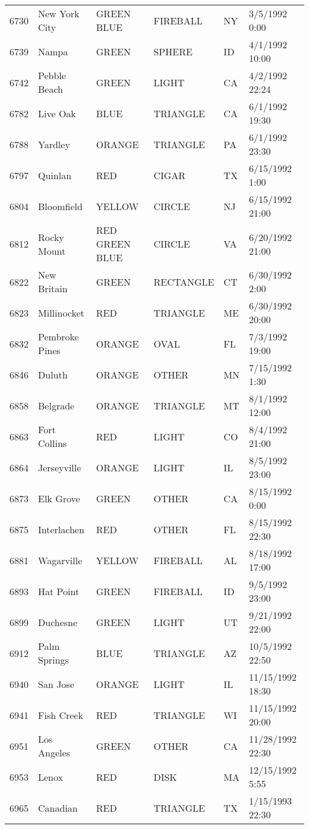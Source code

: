 \begin{tabular}{llllll}
6730 & New York City & GREEN BLUE & FIREBALL & NY & 3/5/1992 0:00 \\
6739 & Nampa & GREEN & SPHERE & ID & 4/1/1992 10:00 \\
6742 & Pebble Beach & GREEN & LIGHT & CA & 4/2/1992 22:24 \\
6782 & Live Oak & BLUE & TRIANGLE & CA & 6/1/1992 19:30 \\
6788 & Yardley & ORANGE & TRIANGLE & PA & 6/1/1992 23:30 \\
6797 & Quinlan & RED & CIGAR & TX & 6/15/1992 1:00 \\
6804 & Bloomfield & YELLOW & CIRCLE & NJ & 6/15/1992 21:00 \\
6812 & Rocky Mount & RED GREEN BLUE & CIRCLE & VA & 6/20/1992 21:00 \\
6822 & New Britain & GREEN & RECTANGLE & CT & 6/30/1992 2:00 \\
6823 & Millinocket & RED & TRIANGLE & ME & 6/30/1992 20:00 \\
6832 & Pembroke Pines & ORANGE & OVAL & FL & 7/3/1992 19:00 \\
6846 & Duluth & ORANGE & OTHER & MN & 7/15/1992 1:30 \\
6858 & Belgrade & ORANGE & TRIANGLE & MT & 8/1/1992 12:00 \\
6863 & Fort Collins & RED & LIGHT & CO & 8/4/1992 21:00 \\
6864 & Jerseyville & ORANGE & LIGHT & IL & 8/5/1992 23:00 \\
6873 & Elk Grove & GREEN & OTHER & CA & 8/15/1992 0:00 \\
6875 & Interlachen & RED & OTHER & FL & 8/15/1992 22:30 \\
6881 & Wagarville & YELLOW & FIREBALL & AL & 8/18/1992 17:00 \\
6893 & Hat Point & GREEN & FIREBALL & ID & 9/5/1992 23:00 \\
6899 & Duchesne & GREEN & LIGHT & UT & 9/21/1992 22:00 \\
6912 & Palm Springs & BLUE & TRIANGLE & AZ & 10/5/1992 22:50 \\
6940 & San Jose & ORANGE & LIGHT & IL & 11/15/1992 18:30 \\
6941 & Fish Creek & RED & TRIANGLE & WI & 11/15/1992 20:00 \\
6951 & Los Angeles & GREEN & OTHER & CA & 11/28/1992 22:30 \\
6953 & Lenox & RED & DISK & MA & 12/15/1992 5:55 \\
6965 & Canadian & RED & TRIANGLE & TX & 1/15/1993 22:30 \\

\end{tabular}
